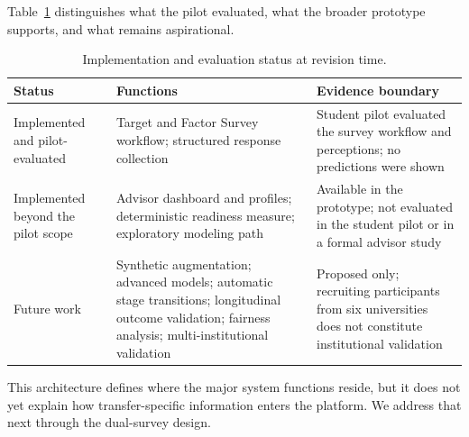 \documentclass[letterpaper,11pt]{article}
\begin{document}
Table~\ref{tab:status} distinguishes what the pilot evaluated, what the broader prototype supports, and what remains aspirational.

\begin{table}[htbp]
\caption{Implementation and evaluation status at revision time.}
\label{tab:status}
\centering
\begin{tabular}{@{}p{3.0cm}p{5.0cm}p{4.5cm}@{}}
\toprule
\textbf{Status} & \textbf{Functions} & \textbf{Evidence boundary} \\
\midrule
Implemented and pilot-evaluated & Target and Factor Survey workflow; structured response collection & Student pilot evaluated the survey workflow and perceptions; no predictions were shown \\
Implemented beyond the pilot scope & Advisor dashboard and profiles; deterministic readiness measure; exploratory modeling path & Available in the prototype; not evaluated in the student pilot or in a formal advisor study \\
Future work & Synthetic augmentation; advanced models; automatic stage transitions; longitudinal outcome validation; fairness analysis; multi-institutional validation & Proposed only; recruiting participants from six universities does not constitute institutional validation \\
\bottomrule
\end{tabular}
\end{table}

This architecture defines where the major system functions reside, but it does not yet explain how transfer-specific information enters the platform. We address that next through the dual-survey design.
\end{document}
